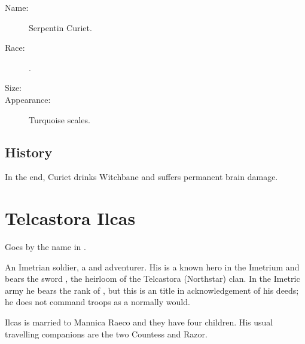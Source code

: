 \begin{description}
  \item[Name:] Serpentin Curiet. 
  \item[Race:] \Scatha{}. 
  \item[Size:] 
  \item[Appearance:] Turquoise scales. 
\end{description}









\subsection{History}
In the end, {Curiet drinks Witchbane} and suffers permanent brain damage. 















\section{Telcastora Ilcas}
Goes by the name  in \Velcad{}. 

An Imetrian soldier, a \nycaneer{} and adventurer. His is a known hero in the Imetrium and bears the sword , the heirloom of the Telcastora (Northstar) clan. In the Imetric army he bears the rank of \Retaxis{}, but this is an \honorary title in acknowledgement of his deeds; he does not command troops as a \Retaxis{} normally would. 

Ilcas is married to Mannica Raeco and they have four children. His usual travelling companions are the two \nycans{} Countess and Razor. 


